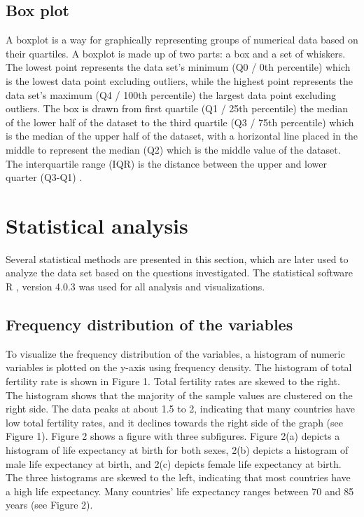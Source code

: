 \documentclass[12 pt]{scrartcl}
\begin{document}
\subsection{Box plot}
A boxplot is a way for graphically representing groups of numerical data based on their quartiles. A boxplot is made up of two parts: a box and a set of whiskers. The lowest point represents the data set's minimum (Q0 / 0th percentile) which is the lowest data point excluding outliers, while the highest point represents the data set's maximum (Q4 / 100th percentile) the largest data point excluding outliers. The box is drawn from first quartile (Q1 / 25th percentile) the median of the lower half of the dataset to the third quartile (Q3 / 75th percentile) which is the median of the upper half of the dataset, with a horizontal line placed in the middle to represent the median (Q2) which is the middle value of the dataset. The interquartile range (IQR) is the distance between the upper and lower quarter (Q3-Q1) \citep{Stat_Methods}.

\section{Statistical analysis}

Several statistical methods are presented in this section, which are later used to analyze the data set based on the questions investigated. The statistical software R \citep{R}, version 4.0.3 was used for all analysis and visualizations.

\subsection{Frequency distribution of the variables}

To visualize the frequency distribution of the variables, a histogram of numeric variables is plotted on the y-axis using frequency density. The histogram of total fertility rate is shown in Figure 1. Total fertility rates are skewed to the right. The histogram shows that the majority of the sample values are clustered on the right side. The data peaks at about 1.5 to 2, indicating that many countries have low total fertility rates, and it declines towards the right side of the graph (see Figure 1). 
Figure 2 shows a figure with three subfigures. Figure 2(a) depicts a histogram of life expectancy at birth for both sexes, 2(b) depicts a histogram of male life expectancy at birth, and 2(c) depicts female life expectancy at birth. The three histograms are skewed to the left, indicating that most countries have a high life expectancy. Many countries' life expectancy ranges between 70 and 85 years (see Figure 2).
\end{document}
